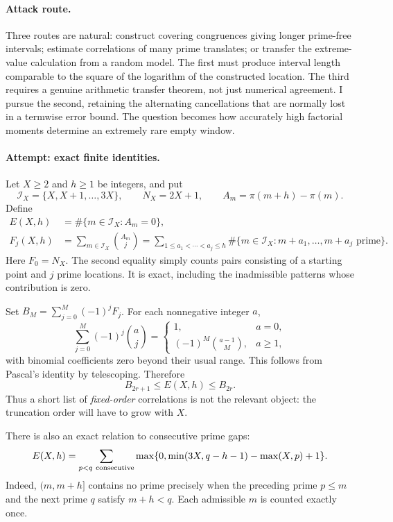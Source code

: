 \documentclass[11pt,a4paper]{article}
\numberwithin{equation}{section}
\begin{document}
\paragraph{Attack route.}
Three routes are natural: construct covering congruences giving longer
prime-free intervals; estimate correlations of many prime translates;
or transfer the extreme-value calculation from a random model. The first
must produce interval length comparable to the square of the logarithm
of the constructed location. The third requires a genuine arithmetic
transfer theorem, not just numerical agreement. I pursue the second,
retaining the alternating cancellations that are normally lost in a
termwise error bound. The question becomes how accurately high factorial
moments determine an extremely rare empty window.

\paragraph{Attempt: exact finite identities.}
Let $X\ge2$ and $h\ge1$ be integers, and put
\[
 \mathcal I_X=\{X,X+1,\ldots,3X\},\qquad N_X=2X+1,
 \qquad A_m=\pi(m+h)-\pi(m).
\]
Define
\begin{align}
 E(X,h)&=\#\{m\in\mathcal I_X:A_m=0\},\label{statement:empty}\\
 F_j(X,h)&=\sum_{m\in\mathcal I_X}\binom{A_m}{j}
 =\sum_{1\le a_1<\cdots<a_j\le h}
   \#\{m\in\mathcal I_X:m+a_1,\ldots,m+a_j\text{ prime}\}.
 \label{statement:factorial}
\end{align}
Here $F_0=N_X$. The second equality simply counts pairs consisting of a
starting point and $j$ prime locations. It is exact, including the
inadmissible patterns whose contribution is zero.

Set $B_M=\sum_{j=0}^M(-1)^jF_j$. For each nonnegative integer $a$,
\[
 \sum_{j=0}^M(-1)^j\binom aj=
 \begin{cases}
 1,&a=0,\\
 (-1)^M\binom{a-1}{M},&a\ge1,
 \end{cases}
\]
with binomial coefficients zero beyond their usual range. This follows
from Pascal's identity by telescoping. Therefore
\begin{equation}\label{statement:bonferroni}
 B_{2r+1}\le E(X,h)\le B_{2r}.
\end{equation}
Thus a short list of \emph{fixed-order} correlations is not the relevant
object: the truncation order will have to grow with $X$.

There is also an exact relation to consecutive prime gaps:
\begin{equation}\label{statement:gap-identity}
 E(X,h)=\sum_{p<q\ {\rm consecutive}}
 \max\{0,\min(3X,q-h-1)-\max(X,p)+1\}.
\end{equation}
Indeed, $(m,m+h]$ contains no prime precisely when the preceding prime
$p\le m$ and the next prime $q$ satisfy $m+h<q$. Each admissible $m$ is
counted exactly once.
\end{document}
